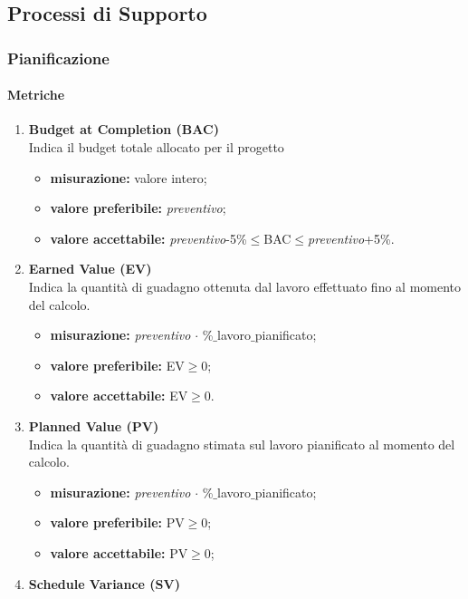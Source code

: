\subsection{Processi di Supporto}
	\subsubsection{Pianificazione}
		\paragraph{Metriche}
		\begin{enumerate}
		\item[]
			\textbf{Budget at Completion (BAC)}\\
			Indica il budget totale allocato per il progetto
			\begin{itemize}
				\item \textbf{misurazione:} valore intero;
				\item \textbf{valore preferibile:} \textit{preventivo};
				\item \textbf{valore accettabile:} \textit{preventivo}-5\%$\leq$BAC$\leq$\textit{preventivo}+5\%.
			\end{itemize}
		\item[]
			\textbf{Earned Value (EV)}\\
			Indica la quantità di guadagno ottenuta dal lavoro effettuato fino al momento del calcolo.
			\begin{itemize}
				\item \textbf{misurazione:} \textit{preventivo} $\cdot$ \%$\_$lavoro$\_$pianificato;
				\item \textbf{valore preferibile:} EV$\geq$0;
				\item \textbf{valore accettabile:} EV$\geq$0.
			\end{itemize}
		\item[]
			\textbf{Planned Value (PV)}\\
			Indica la quantità di guadagno stimata sul lavoro pianificato al momento del calcolo.
			\begin{itemize}
				\item \textbf{misurazione:} \textit{preventivo} $\cdot$ \%$\_$lavoro$\_$pianificato;
				\item \textbf{valore preferibile:} PV$\geq$0;
				\item \textbf{valore accettabile:} PV$\geq$0;
			\end{itemize}
		\item[]
			\textbf{Schedule Variance (SV)}\\

\end{enumerate}
